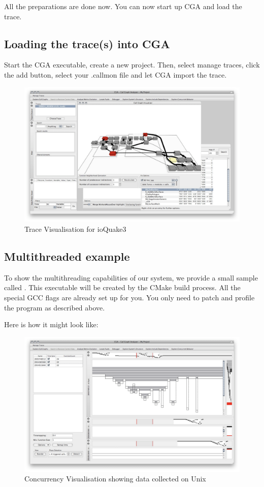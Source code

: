 All the preparations are done now. You can now start up CGA and load the trace.

\subsection{Loading the trace(s) into CGA} Start the CGA executable, create a new project. Then, select manage traces, click the add button, select your .callmon file and let CGA import the trace.

\begin{figure}[ht]
\centering
\includegraphics[width=16cm]{images/ioquake3_trace}
\caption{Trace Visualisation for ioQuake3}\label{fig:ioquake3_trace}
\end{figure}

\subsection{Multithreaded example} To show the multithreading capabilities of our system, we provide a small sample called . This executable will be created by the CMake build process. All the special GCC flags are already set up for you. You only need to patch and profile the program as described above.

Here is how it might look like:
\begin{figure}[ht]
\centering
\includegraphics[width=16cm]{images/cga_threads}
\caption{Concurrency Visualisation showing data collected on Unix}\label{fig:cga_threads}
\end{figure}
